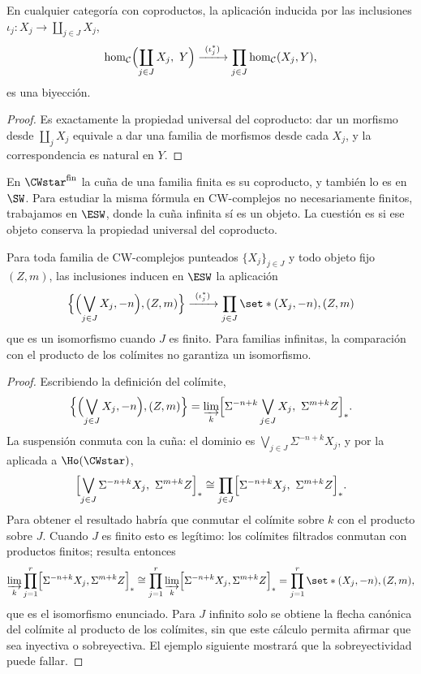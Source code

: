 \begin{prop}\label{prop:prod-morfismos}
En cualquier categoría con coproductos, la aplicación inducida por las inclusiones $\iota_j\colon X_j\to\coprod_{j\in J}X_j$,
\[
\hom_{\mathcal C}\Bigl(\coprod_{j\in J}X_j,\ Y\Bigr)\xrightarrow{\ (\iota_j^*)\ }\prod_{j\in J}\hom_{\mathcal C}(X_j,Y),
\]
es una biyección.
\end{prop}
\begin{proof}
Es exactamente la propiedad universal del coproducto: dar un morfismo desde $\coprod_jX_j$ equivale a dar una familia de morfismos desde cada $X_j$, y la correspondencia es natural en $Y$.
\end{proof}

En $\CWstar^{\mathrm{fin}}$ la cuña de una familia finita es su coproducto, y también lo es en $\SW$. Para estudiar la misma fórmula en CW-complejos no necesariamente finitos, trabajamos en $\ESW$, donde la cuña infinita sí es un objeto. La cuestión es si ese objeto conserva la propiedad universal del coproducto.

\begin{prop}\label{prop:aditividad-familias}
Para toda familia de CW-complejos punteados $\{X_j\}_{j\in J}$ y todo objeto fijo $(Z,m)$, las inclusiones inducen en $\ESW$ la aplicación
\[
\Bigl\{\Bigl(\bigvee_{j\in J}X_j,-n\Bigr),(Z,m)\Bigr\}\xrightarrow{\ (\iota_j^*)\ }\prod_{j\in J}\set*{(X_j,-n),(Z,m)}
\]
que es un isomorfismo cuando $J$ es finito. Para familias infinitas, la comparación con el producto de los colímites no garantiza un isomorfismo.
\end{prop}
\begin{proof}
Escribiendo la definición del colímite,
\[
\Bigl\{\Bigl(\bigvee_{j\in J}X_j,-n\Bigr),(Z,m)\Bigr\}
=\varinjlim_k\Bigl[\Sigma^{-n+k}\bigvee_{j\in J}X_j,\ \Sigma^{m+k}Z\Bigr]_* .
\]
La suspensión conmuta con la cuña: el dominio es $\bigvee_{j\in J}\Sigma^{-n+k}X_j$, y por la  aplicada a $\Ho(\CWstar)$,
\[
\Bigl[\bigvee_{j\in J}\Sigma^{-n+k}X_j,\ \Sigma^{m+k}Z\Bigr]_*
\cong\prod_{j\in J}\Bigl[\Sigma^{-n+k}X_j,\ \Sigma^{m+k}Z\Bigr]_* .
\]
Para obtener el resultado habría que conmutar el colímite sobre $k$ con el producto sobre $J$. Cuando $J$ es finito esto es legítimo: los colímites filtrados conmutan con productos finitos; resulta entonces
\[
\varinjlim_k\prod_{j=1}^r\Bigl[\Sigma^{-n+k}X_j,\Sigma^{m+k}Z\Bigr]_*
\cong\prod_{j=1}^r\varinjlim_k\Bigl[\Sigma^{-n+k}X_j,\Sigma^{m+k}Z\Bigr]_*
=\prod_{j=1}^r\set*{(X_j,-n),(Z,m)},
\]
que es el isomorfismo enunciado. Para $J$ infinito solo se obtiene la flecha canónica del colímite al producto de los colímites, sin que este cálculo permita afirmar que sea inyectiva o sobreyectiva. El ejemplo siguiente mostrará que la sobreyectividad puede fallar.
\end{proof}

